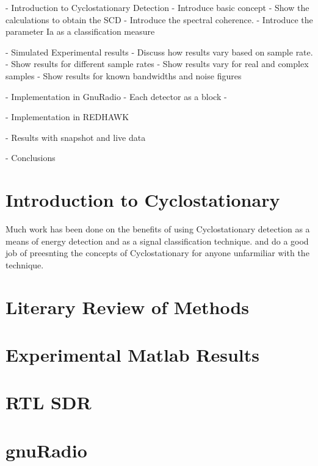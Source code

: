  - Introduction to Cyclostationary Detection
 	- Introduce basic concept
 	- Show the calculations to obtain the SCD
 	- Introduce the spectral coherence.
 	- Introduce the parameter Ia as a classification measure
 
 - Simulated Experimental results
 	- Discuss how results vary based on sample rate.
 	- Show results for different sample rates
 	- Show results vary for real and complex samples
 	- Show results for known bandwidths and noise figures
 	
 - Implementation in GnuRadio
 	-  Each detector as a block
 	- 

 - Implementation in REDHAWK
 
 - Results with snapshot and live data
 
 - Conclusions

\section{Introduction to Cyclostationary}

Much work has been done on the benefits of using Cyclostationary detection as a
means of energy detection and as a signal classification technique. 
\cite{costa96} and \cite{kim2007} do a good job of preesnting the concepts of
Cyclostationary for anyone unfarmiliar with the technique.  
\section{Literary Review of Methods}
\section{Experimental Matlab Results}
\section{RTL SDR}
\section{gnuRadio}
